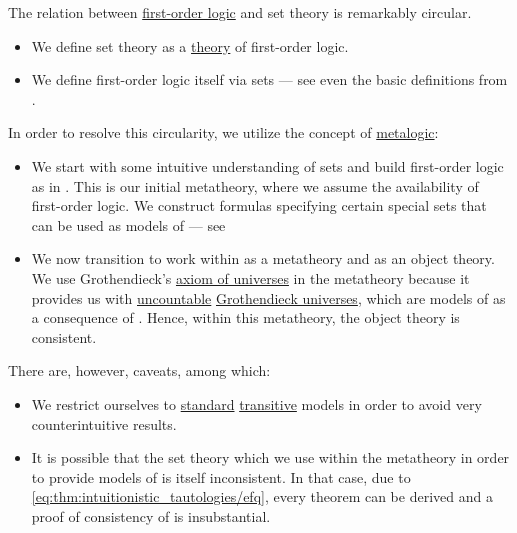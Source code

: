 \begin{remark}\label{rem:set_definition_recursion}
  The relation between \hyperref[subsec:first_order_logic]{first-order logic} and set theory is remarkably circular.

  \begin{itemize}
    \item We define set theory as a \hyperref[def:first_order_theory]{theory} of first-order logic.

    \item We define first-order logic itself via sets --- see even the basic definitions from .
  \end{itemize}

  In order to resolve this circularity, we utilize the concept of \hyperref[con:metalogic]{metalogic}:
  \begin{itemize}
    \item We start with some intuitive understanding of sets and build first-order logic as in . This is our initial metatheory, where we assume the availability of first-order logic. We construct formulas specifying certain special sets that can be used as models of  --- see 

    \item We now transition to work within  as a metatheory and  as an object theory. We use Grothendieck's \hyperref[def:axiom_of_universes]{axiom of universes} in the metatheory because it provides us with \hyperref[def:set_countability/uncountable]{uncountable} \hyperref[def:grothendieck_universe]{Grothendieck universes}, which are models of  as a consequence of . Hence, within this metatheory, the object theory  is consistent.
  \end{itemize}

  There are, however, caveats, among which:
  \begin{itemize}
    \item We restrict ourselves to \hyperref[rem:standard_model_of_set_theory]{standard} \hyperref[rem:transitive_model_of_set_theory]{transitive} models in order to avoid very counterintuitive results.

    \item It is possible that the set theory which we use within the metatheory in order to provide models of  is itself inconsistent. In that case, due to \eqref{eq:thm:intuitionistic_tautologies/efq}, every theorem can be derived and a proof of consistency of  is insubstantial.
  \end{itemize}
\end{remark}

